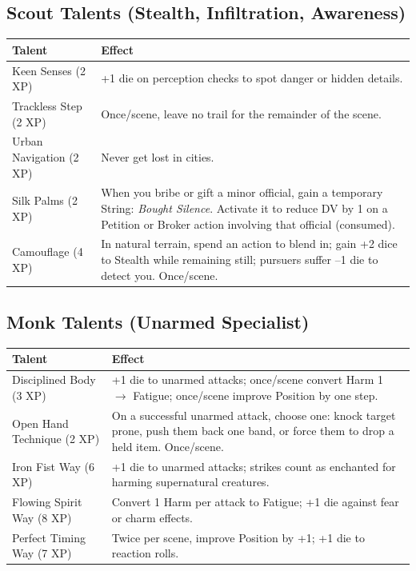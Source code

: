 \subsection{Scout Talents (Stealth, Infiltration, Awareness)}

\begin{tabular}{@{}lp{10cm}@{}}
\toprule
\textbf{Talent} & \textbf{Effect} \\
\midrule
Keen Senses (2 XP) & +1 die on perception checks to spot danger or hidden details. \\
Trackless Step (2 XP) & Once/scene, leave no trail for the remainder of the scene. \\
Urban Navigation (2 XP) & Never get lost in cities. \\
Silk Palms (2 XP) & When you bribe or gift a minor official, gain a temporary String: \textit{Bought Silence}. Activate it to reduce DV by 1 on a Petition or Broker action involving that official (consumed). \\
Camouflage (4 XP) & In natural terrain, spend an action to blend in; gain +2 dice to Stealth while remaining still; pursuers suffer –1 die to detect you. Once/scene. \\
\bottomrule
\end{tabular}

\subsection{Monk Talents (Unarmed Specialist)}

\begin{tabular}{@{}lp{10cm}@{}}
\toprule
\textbf{Talent} & \textbf{Effect} \\
\midrule
Disciplined Body (3 XP) & +1 die to unarmed attacks; once/scene convert Harm 1 $\rightarrow$ Fatigue; once/scene improve Position by one step. \\
Open Hand Technique (2 XP) & On a successful unarmed attack, choose one: knock target prone, push them back one band, or force them to drop a held item. Once/scene. \\
Iron Fist Way (6 XP) & +1 die to unarmed attacks; strikes count as enchanted for harming supernatural creatures. \\
Flowing Spirit Way (8 XP) & Convert 1 Harm per attack to Fatigue; +1 die against fear or charm effects. \\
Perfect Timing Way (7 XP) & Twice per scene, improve Position by +1; +1 die to reaction rolls. \\
\bottomrule
\end{tabular}

